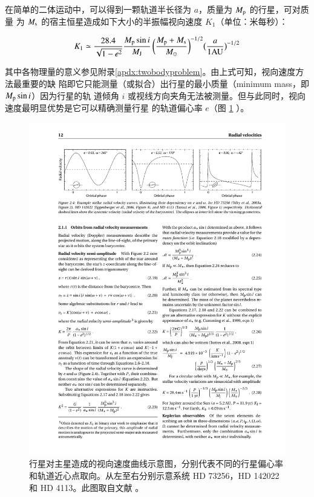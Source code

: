 在简单的二体运动中，可以得到一颗轨道半长径为 $a$，质量为 $M_\mathrm{p}$ 的行星，可对质量
为 $M_\mathrm{s}$ 的宿主恒星造成如下大小的半振幅视向速度 $K_1$（单位：米每秒）：

\begin{equation}  \label{eq:rvk} 
K_1 \simeq \frac{28.4 }{\sqrt{1-e^2}} \frac{M_\mathrm{p}\sin i}{M_\mathrm{J}} \, \bigg(\frac{M_\mathrm{p}+M_\mathrm{s}}{M_\odot}\bigg)^{-1/2} \big(\frac{a}{1 \mathrm{AU}}\big)^{-1/2}
\end{equation}  %


其中各物理量的意义参见附录\ref{apdx:twobodyproblem}。由上式可知，视向速度方法最重要的缺
陷即它只能测量（或拟合）出行星的最小质量（minimum mass，即$M_\mathrm{p}\sin i$）因为行星的轨
道倾角 $i$ 或视线方向夹角无法被测量。但与此同时，视向速度最明显优势是它可以精确测量行星
的轨道偏心率 $e$（图 \ref{fig:rvcurve} ）。

\begin{figure}[h!]
\centering
\includegraphics[width=1.0\textwidth]{figures/chapter1/fig5_rvcurve.pdf}
\caption[行星对主星造成的视向速度曲线示意图，从左至右分别代表不同的行星偏心率和轨道近心点取向。此图版权归 Perryman M. 所有。]{行星对主星造成的视向速度曲线示意图，分别代表不同的行星偏心率和轨道近心点取向。从左至右分别示意系统 HD 73256\cite{Udry2003HD73256}，HD 142022\cite{Eggenberger2006HD142022} 和 HD 4113\cite{Tamuz2008HD4113}。此图取自文献 。}
\label{fig:rvcurve}
\end{figure}

